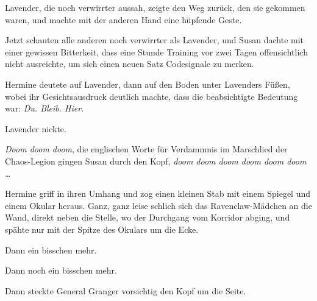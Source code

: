 Lavender, die noch verwirrter aussah, zeigte den Weg zurück, den sie gekommen waren, und machte mit der anderen Hand eine hüpfende Geste.

Jetzt schauten alle anderen noch verwirrter als Lavender, und Susan dachte mit einer gewissen Bitterkeit, dass eine Stunde Training vor zwei Tagen offensichtlich nicht ausreichte, um sich einen neuen Satz Codesignale zu merken.

Hermine deutete auf Lavender, dann auf den Boden unter Lavenders Füßen, wobei ihr Gesichtsausdruck deutlich machte, dass die beabsichtigte Bedeutung war: \emph{Du. Bleib. Hier}.

Lavender nickte.

\emph{Doom doom doom}, die englischen Worte für Verdammnis im Marschlied der Chaos-Legion gingen Susan durch den Kopf, \emph{doom doom doom doom doom doom} … %

Hermine griff in ihren Umhang und zog einen kleinen Stab mit einem Spiegel und einem Okular heraus. Ganz, ganz leise schlich sich das Ravenclaw-Mädchen an die Wand, direkt neben die Stelle, wo der Durchgang vom Korridor abging, und spähte nur mit der Spitze des Okulars um die Ecke.

Dann ein bisschen mehr.

Dann noch ein bisschen mehr.

Dann steckte General Granger vorsichtig den Kopf um die Seite.


